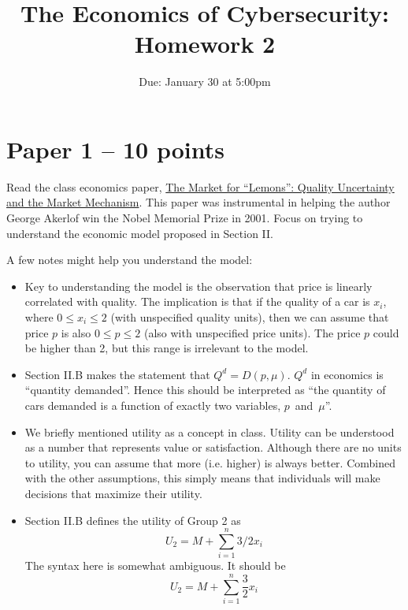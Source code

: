 \documentclass[11pt]{article}
\title{The Economics of Cybersecurity: Homework 2}
\date{Due: January 30 at 5:00pm}
\author{}
\begin{document}
\maketitle

\section{Paper 1 -- 10 points}

Read the class economics paper, \href{https://www.jstor.org/stable/1879431}{The Market for ``Lemons'': Quality Uncertainty and the Market Mechanism}. 
This paper was instrumental in helping the author George Akerlof win the Nobel Memorial Prize in 2001. 
Focus on trying to understand the economic model proposed in Section II.

A few notes might help you understand the model:
\begin{itemize}
    \item Key to understanding the model is the observation that price is linearly correlated with quality. The implication is that if the quality of a car is $x_i$, where $0\leq x_i \leq 2$ (with unspecified quality units), then we can assume that price $p$ is also $0 \leq p \leq 2$ (also with unspecified price units). The price $p$ could be higher than 2, but this range is irrelevant to the model. 
    \item Section II.B makes the statement that $Q^d = D(p, \mu)$. $Q^d$ in economics is ``quantity demanded''. Hence this should be interpreted as ``the quantity of cars demanded is a function of exactly two variables, $p$~and~$\mu$''.
    \item We briefly mentioned utility as a concept in class. Utility can be understood as a number that represents value or satisfaction. Although there are no units to utility, you can assume that more (i.e. higher) is always better. Combined with the other assumptions, this simply means that individuals will make decisions that maximize their utility.
    \item Section II.B defines the utility of Group 2 as $$U_2 = M + \sum_{i=1}^{n}{3/2x_i}$$ The syntax here is somewhat ambiguous. It should be $$U_2 = M + \sum_{i=1}^{n}{\frac{3}{2}x_i}$$
\end{itemize}
\end{document}
